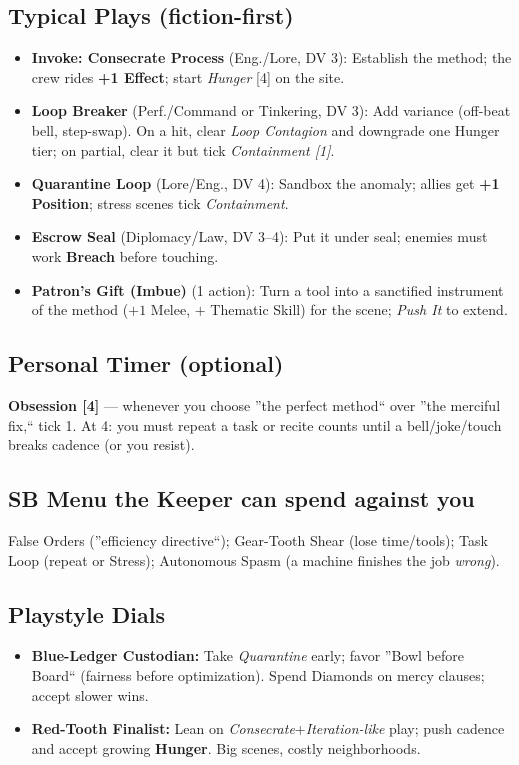 \documentclass[11pt]{article}
\begin{document}
\subsection*{Typical Plays (fiction-first)}
\begin{itemize}[leftmargin=*]
  \item \textbf{Invoke: Consecrate Process} (Eng./Lore, DV 3): Establish the method; the crew rides \textbf{+1 Effect}; start \emph{Hunger} [4] on the site.
  \item \textbf{Loop Breaker} (Perf./Command or Tinkering, DV 3): Add variance (off-beat bell, step-swap). On a hit, clear \emph{Loop Contagion} and downgrade one Hunger tier; on partial, clear it but tick \emph{Containment [1]}.
  \item \textbf{Quarantine Loop} (Lore/Eng., DV 4): Sandbox the anomaly; allies get \textbf{+1 Position}; stress scenes tick \emph{Containment}.
  \item \textbf{Escrow Seal} (Diplomacy/Law, DV 3--4): Put it under seal; enemies must work \textbf{Breach} before touching.
  \item \textbf{Patron's Gift (Imbue)} (1 action): Turn a tool into a sanctified instrument of the method (\(+1\) Melee, \(+\) Thematic Skill) for the scene; \emph{Push It} to extend.
\end{itemize}

\subsection*{Personal Timer (optional)}
\textbf{Obsession [4]} --- whenever you choose ''the perfect method`` over ''the merciful fix,`` tick 1. At 4: you must repeat a task or recite counts until a bell/joke/touch breaks cadence (or you resist).

\subsection*{SB Menu the Keeper can spend against you}
False Orders (''efficiency directive``); Gear-Tooth Shear (lose time/tools); Task Loop (repeat or Stress); Autonomous Spasm (a machine finishes the job \emph{wrong}).

\subsection*{Playstyle Dials}
\begin{itemize}[leftmargin=*]
  \item \textbf{Blue-Ledger Custodian:} Take \emph{Quarantine} early; favor ''Bowl before Board`` (fairness before optimization). Spend Diamonds on mercy clauses; accept slower wins.
  \item \textbf{Red-Tooth Finalist:} Lean on \emph{Consecrate}+\emph{Iteration-like} play; push cadence and accept growing \textbf{Hunger}. Big scenes, costly neighborhoods.
\end{itemize}
\end{document}
